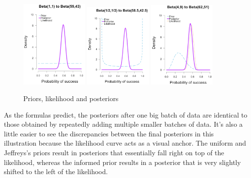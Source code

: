 \begin{figure}[h]
    \centering
\includegraphics[width=0.3\textwidth]{pic/p05c03-snip12-1.png}
\includegraphics[width=0.3\textwidth]{pic/p05c03-snip12-2.png}
\includegraphics[width=0.3\textwidth]{pic/p05c03-snip12-3.png}
    \caption{Priors, likelihood and posteriors}
    \label{fig:p05c03-snip12}
\end{figure}

\FloatBarrier


As the formulas predict, the posteriors after one big batch of data are identical to those obtained by repeatedly adding multiple smaller batches of data. It's also a little easier to see the discrepancies between the final posteriors in this illustration because the likelihood curve acts as a visual anchor. The uniform and Jeffreys's priors result in posteriors that essentially fall right on top of the likelihood, whereas the informed prior results in a posterior that is very slightly shifted to the left of the likelihood.

